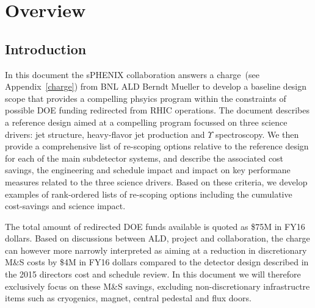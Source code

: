 \chapter*{Overview}
\label{configurations}
\setcounter{page}{1}

\section{Introduction}
In this document the sPHENIX collaboration answers a charge~(see
Appendix~\ref{charge}) from BNL ALD Berndt Mueller to develop
a baseline design scope that provides a compelling phsyics program
within the constraints of possible DOE funding redirected from 
RHIC operations. The document describes a reference design aimed
at a compelling program focussed on three science drivers: jet structure,
heavy-flavor jet production and $\Upsilon$ spectroscopy. We then
provide a comprehensive list of re-scoping options relative 
to the reference design for each
of the main subdetector systems, and describe the associated
cost savings, the engineering and schedule impact and impact on 
key performane measures related to the three science 
drivers. Based on these criteria, we develop examples of 
rank-ordered lists of re-scoping options including the 
cumulative cost-savings and science impact.

The total amount of redirected DOE funds available is quoted as \$75M in FY16 dollars.
Based on discussions between ALD, project and collaboration, the charge can
however more narrowly interpreted as aiming at a reduction in discretionary M\&S costs 
by \$4M in FY16 dollars compared to the detector design described
in the 2015 directors cost and schedule review. In this document we will
therefore exclusively focus on these M\&S savings, excluding non-discretionary 
infrastructre items such as cryogenics, magnet, central pedestal and flux doors.

